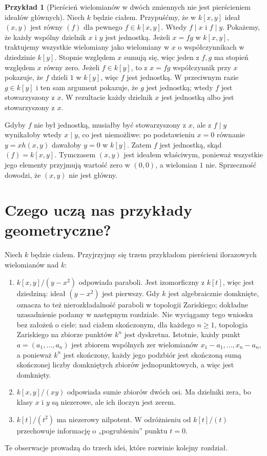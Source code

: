 \documentclass[11pt,a4paper,openany]{report}
\numberwithin{equation}{section}
\theoremstyle{plain}
\theoremstyle{definition}
\newtheorem{przyklad}[twierdzenie]{Przykład}
\theoremstyle{remark}
\begin{document}
\begin{przyklad}[Pierścień wielomianów w dwóch zmiennych nie jest pierścieniem ideałów głównych]
Niech $k$ będzie ciałem. Przypuśćmy, że w $k[x,y]$ ideał $(x,y)$ jest równy $(f)$
dla pewnego $f\in k[x,y]$. Wtedy $f\mid x$ i $f\mid y$.
Pokażemy, że każdy wspólny dzielnik $x$ i $y$ jest jednostką.
Jeżeli $x=fg$ w $k[x,y]$, traktujemy wszystkie wielomiany
jako wielomiany w $x$ o współczynnikach w dziedzinie $k[y]$.
Stopnie względem $x$ sumują się, więc jeden z $f,g$ ma stopień
względem $x$ równy zero. Jeżeli $f\in k[y]$, to z $x=fg$
współczynnik przy $x$ pokazuje, że $f$ dzieli $1$ w $k[y]$,
więc $f$ jest jednostką. W przeciwnym razie $g\in k[y]$
i ten sam argument pokazuje, że $g$ jest jednostką;
wtedy $f$ jest stowarzyszony z $x$.
W rezultacie każdy dzielnik $x$ jest jednostką albo jest
stowarzyszony z $x$.

Gdyby $f$ nie był jednostką, musiałby być stowarzyszony z $x$,
ale z $f\mid y$ wynikałoby wtedy $x\mid y$, co jest niemożliwe:
po podstawieniu $x=0$ równanie $y=xh(x,y)$ dawałoby $y=0$
w $k[y]$. Zatem $f$ jest jednostką, skąd $(f)=k[x,y]$.
Tymczasem $(x,y)$ jest ideałem właściwym, ponieważ
wszystkie jego elementy przyjmują wartość zero w $(0,0)$,
a wielomian $1$ nie. Sprzeczność dowodzi, że $(x,y)$ nie jest główny.
\end{przyklad}

\section{Czego uczą nas przykłady geometryczne?}

Niech $k$ będzie ciałem. Przyjrzyjmy się trzem przykładom
pierścieni ilorazowych wielomianów nad $k$:
\begin{enumerate}[label=\arabic*)]
\item $k[x,y]/(y-x^2)$ odpowiada paraboli. Jest izomorficzny z $k[t]$,
więc jest dziedziną: ideał $(y-x^2)$ jest pierwszy.
Gdy $k$ jest algebraicznie domknięte, oznacza to też
nierozkładalność paraboli w topologii Zariskiego; dokładne uzasadnienie
podamy w następnym rozdziale. Nie wyciągamy tego wniosku bez założeń
o ciele: nad ciałem skończonym, dla każdego $n\ge1$,
topologia Zariskiego na zbiorze punktów $k^n$ jest dyskretna. Istotnie, każdy punkt
$a=(a_1,\dots,a_n)$ jest zbiorem wspólnych zer
wielomianów $x_1-a_1,\dots,x_n-a_n$, a ponieważ
$k^n$ jest skończony, każdy jego podzbiór jest skończoną
sumą skończonej liczby domkniętych zbiorów jednopunktowych,
a więc jest domknięty.
\item $k[x,y]/(xy)$ odpowiada sumie zbiorów dwóch osi. Ma dzielniki zera,
bo klasy $x$ i $y$ są niezerowe, ale ich iloczyn jest zerem.
\item $k[t]/(t^2)$ ma niezerowy nilpotent. W odróżnieniu od
$k[t]/(t)$ przechowuje informację o „pogrubieniu” punktu $t=0$.
\end{enumerate}
Te obserwacje prowadzą do trzech idei, które rozwinie kolejny rozdział.
\end{document}
